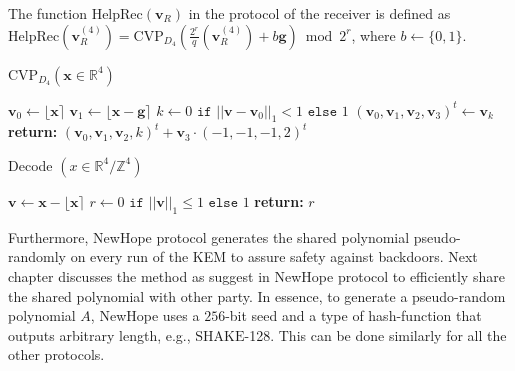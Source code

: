 {%


The function $\mathrm{HelpRec}(\textbf{v}_{R})$ in the protocol of the receiver is defined as $\mathrm{HelpRec}(\textbf{v}_{R}^{(4)}) = \mathrm{CVP}_{D_4} (\frac{2^r}{q} (\textbf{v}_{R}^{(4)}) + b  \textbf{g}) \bmod 2^r$, where $b \leftarrow \{0, 1\}$.


\begin{algorithm}[H]
    \caption{CVP$_{D_{4}} (\textbf{x} \in \mathbb{R}^4)$}
    \begin{algorithmic}[1]
            \State $\textbf{v}_{0} \leftarrow \lfloor \textbf{x} \rceil$
            \State $\textbf{v}_{1} \leftarrow \lfloor \textbf{x} - \textbf{g} \rceil$
            \State $k \leftarrow 0 \texttt{ if } ||\textbf{v} - \textbf{v}_{0}||_{1} < 1 \texttt{ else } 1$
            \State $(\textbf{v}_0, \textbf{v}_1, \textbf{v}_2, \textbf{v}_3)^{t} \leftarrow \textbf{v}_{k}$
            \State \textbf{return:} $(\textbf{v}_0, \textbf{v}_1, \textbf{v}_2, k)^{t} + \textbf{v}_{3} \cdot (-1, -1, -1, 2)^t$
        \EndProcedure
    \end{algorithmic}
\end{algorithm}

\begin{algorithm}[H]
    \caption{Decode $(x \in \mathbb{R}^4 / \mathbb{Z}^4)$}
    \begin{algorithmic}[1]
            \State $\textbf{v} \leftarrow \textbf{x} - \lfloor \textbf{x} \rceil$
            \State $r \leftarrow  0 \texttt{ if } ||\textbf{v}||_{1} \le 1 \texttt{ else } 1$
            \State \textbf{return:} $r$
        \EndProcedure
    \end{algorithmic}
\end{algorithm}
}

Furthermore, NewHope protocol generates the shared polynomial pseudo-randomly on every run of the KEM to assure safety against backdoors. Next chapter discusses the method as suggest in NewHope protocol to efficiently share the shared polynomial with other party. In essence, to generate a pseudo-random polynomial $A$, NewHope uses a $256$-bit seed and a type of hash-function that outputs arbitrary length, e.g., $\mathrm{SHAKE}$-128. This can be done similarly for all the other protocols.





